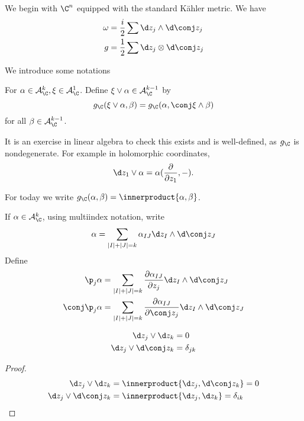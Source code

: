 \documentclass[a4paper]{article}
\newcommand{\w}{\wedge} %
\newcommand*{\ip}{\innerproduct}
\begin{document}
We begin with \(\C^n\) equipped with the standard Kähler metric. We have
\begin{align*}
  \omega &= \frac{i}{2} \sum \d z_j \w \d \conj z_j \\
  g &= \frac{1}{2} \sum \d z_j \otimes \d \conj z_j
\end{align*}

We introduce some notations
\begin{definition}
  For \(\alpha \in \mathcal A_\C^k, \xi \in \mathcal A_\C^1\). Define \(\xi \vee \alpha \in \mathcal A_\C^{k - 1}\) by
  \[
    g_\C(\xi \vee \alpha, \beta) = g_\C(\alpha, \conj \xi \w \beta)
  \]
  for all \(\beta \in \mathcal A_\C^{k - 1}\).
\end{definition}
It is an exercise in linear algebra to check this exists and is well-defined, as \(g_\C\) is nondegenerate. For example in holomorphic coordinates,
\[
  \d z_1 \vee \alpha = \alpha( \frac{\partial  }{\partial z_1}, -).
\]

For today we write \(g_\C(\alpha, \beta) = \ip{\alpha, \beta}\).

\begin{definition}
  If \(\alpha \in \mathcal A_\C^k\), using multiindex notation, write
  \[
    \alpha = \sum_{|I| + |J| = k} \alpha_{IJ} \d z_I \w \d \conj z_J
  \]
  Define
  \begin{align*}
    \p_j \alpha &= \sum_{|I| + |J| = k} \frac{\partial \alpha_{IJ}}{\partial z_j} \d z_I \w \d \conj z_J \\
    \conj \p_j \alpha &= \sum_{|I| + |J| = k} \frac{\partial \alpha_{IJ}}{\partial \conj z_j} \d z_I \w \d \conj z_J
  \end{align*}
\end{definition}

\begin{lemma}
  \begin{align*}
    \d z_j \vee \d z_k &= 0 \\
    \d z_j \vee \d \conj z_k &= \delta_{jk}
  \end{align*}
\end{lemma}

\begin{proof}
  \begin{align*}
    \d z_j \vee \d z_k &= \ip{\d z_j, \d \conj z_k} = 0 \\
    \d z_j \vee \d \conj z_k &= \ip{\d z_j, \d z_k} = \delta_{ik}
  \end{align*}
\end{proof}
\end{document}

